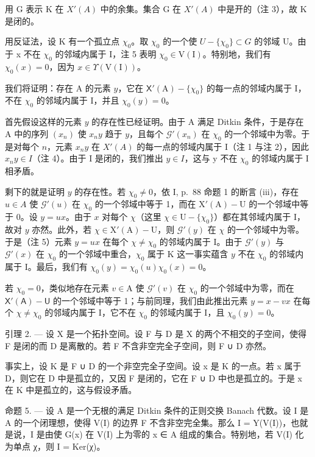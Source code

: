 用 G 表示 K 在 \(X'(A)\) 中的余集。集合 G 在 \(X'(A)\) 中是开的（注 3），故 K 是闭的。

用反证法，设 K 有一个孤立点 \(\chi_{0}\)。取 \(\chi_{0}\) 的一个使 \(U - \{\chi_{0}\}\subset G\) 的邻域 U。由于 x 不在 \(\chi_{0}\) 的邻域内属于 I，注 5 表明 \(\chi_{0}\in\mathrm{V(I)}\)。特别地，我们有 \(\chi_{0}(x)=0\)，因为 \(x\in\Upsilon(\mathrm{V(I)})\)。

我们将证明：存在 A 的元素 \(y\)，它在 \(\mathsf{X}'(\mathrm{A}) - \{\chi_0\}\) 的每一点的邻域内属于 I，不在 \(\chi_0\) 的邻域内属于 I，并且 \(\chi_0(y) = 0\)。

首先假设这样的元素 \(y\) 的存在性已经证明。由于 A 满足 Ditkin 条件，于是存在 A 中的序列 \((x_n)\) 使 \(x_n y\) 趋于 \(y\)，且每个 \(\mathcal{G}'(x_n)\) 在 \(\chi_0\) 的一个邻域中为零。于是对每个 \(n\)，元素 \(x_n y\) 在 \(X'(A)\) 的每一点的邻域内属于 I（注 1 与注 2），因此 \(x_{n}y \in I\)（注 4）。由于 I 是闭的，我们推出 \(y \in I\)，这与 y 不在 \(\chi_{0}\) 的邻域内属于 I 相矛盾。

剩下的就是证明 \(y\) 的存在性。若 \(\chi_0 \neq 0\)，依 I, p.~88 命题 1 的断言 (iii)，存在 \(u \in A\) 使 \(\mathcal{G}'(u)\) 在 \(\chi_0\) 的一个邻域中等于 1，而在 \(\mathrm{X}'(\mathrm{A}) - \mathrm{U}\) 的一个邻域中等于 0。设 \(y = ux\)。由于 \(x\) 对每个 \(\chi\)（这里 \(\chi \in \mathrm{U} - \{\chi_0\}\)）都在其邻域内属于 I，故对 \(y\) 亦然。此外，若 \(\chi \in \mathrm{X}'(\mathrm{A}) - \mathrm{U}\)，则 \(\mathcal{G}'(y)\) 在 \(\chi\) 的一个邻域中为零。于是（注 5）元素 \(y = ux\) 在每个 \(\chi \neq \chi_0\) 的邻域内属于 I。由于 \(\mathcal{G}'(y)\) 与 \(\mathcal{G}'(x)\) 在 \(\chi_0\) 的一个邻域中重合，\(\chi_0\) 属于 K 这一事实蕴含 \(y\) 不在 \(\chi_0\) 的邻域内属于 I。最后，我们有 \(\chi_0(y) = \chi_0(u)\chi_0(x) = 0\)。

若 \(\chi_0 = 0\)，类似地存在元素 \(v \in \mathrm{A}\) 使 \(\mathcal{G}'(v)\) 在 \(\chi_0\) 的一个邻域中为零，而在 \(\mathsf{X}'(\mathsf{A}) - \mathsf{U}\) 的一个邻域中等于 1；与前同理，我们由此推出元素 \(y = x - vx\) 在每个 \(\chi \neq \chi_0\) 的邻域内属于 I，它不在 \(\chi_0\) 的邻域内属于 I，且 \(\chi_0(y) = 0\)。

引理 2. — 设 X 是一个拓扑空间。设 F 与 D 是 X 的两个不相交的子空间，使得 F 是闭的而 D 是离散的。若 F 不含非空完全子空间，则 F ∪ D 亦然。

事实上，设 K 是 F ∪ D 的一个非空完全子空间。设 x 是 K 的一点。若 x 属于 D，则它在 D 中是孤立的，又因 F 是闭的，它在 F ∪ D 中也是孤立的。于是 x 在 K 中是孤立的，这与假设矛盾。

命题 5. — 设 A 是一个无根的满足 Ditkin 条件的正则交换 Banach 代数。设 I 是 A 的一个闭理想，使得 V(I) 的边界 F 不含非空完全集。那么 I = Y(V(I))，也就是说，I 是由使 G(x) 在 V(I) 上为零的 x ∈ A 组成的集合。特别地，若 V(I) 化为单点 χ，则 I = Ker(χ)。

